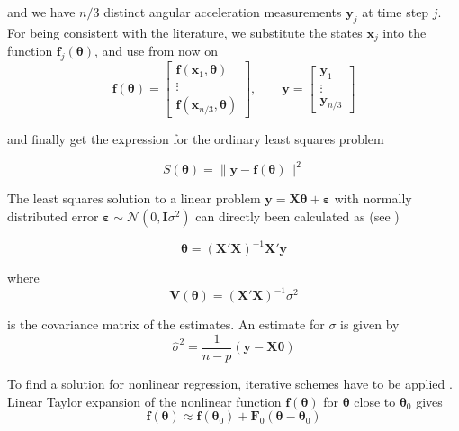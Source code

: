 and we have $n/3$ distinct angular acceleration measurements $\mathbf{y}_j$ at time step $j$.
For being consistent with the literature, we substitute the states $\mathbf{x}_j$ into the function $\mathbf{f}_j(\boldsymbol{\theta})$, and use from now on
\begin{equation}
\mathbf{f}(\boldsymbol{\theta}) = \left[ \begin{array}{c}
\mathbf{f}(\mathbf{x}_1, \boldsymbol{\theta}) \\
\vdots \\
\mathbf{f}(\mathbf{x}_{n/3}, \boldsymbol{\theta})
\end{array} \right]
, \qquad
\mathbf{y} = \left[ \begin{array}{c}
\mathbf{y}_1 \\
\vdots \\
\mathbf{y}_{n/3} 
\end{array} \right]
\end{equation}

and finally get the expression for the ordinary least squares problem

\begin{equation}
S(\boldsymbol{\theta}) = \| \mathbf{y} - \mathbf{f}(\boldsymbol{\theta}) \|^2
\end{equation}

The least squares solution to a linear problem 
$\mathbf{y} = \mathbf{X} \boldsymbol{\theta} + \boldsymbol{\varepsilon}$ 
with normally distributed error 
$\boldsymbol{\varepsilon} \sim \mathcal{N}(0,\mathbf{I} \sigma^2)$ 
can directly been calculated as (see \citep{Draper})

\begin{equation}
\boldsymbol{\theta} = (\mathbf{X}' \mathbf{X})^{-1} \mathbf{X}' \mathbf{y}
\end{equation}

where
\begin{equation}
\mathbf{V} (\boldsymbol{\theta}) = (\mathbf{X}' \mathbf{X})^{-1} {\sigma}^2
\end{equation}

is the covariance matrix of the estimates. An estimate for ${\sigma}$ is given by
\begin{equation}
\hat{\sigma}^2 = \frac{1}{n-p} (\mathbf{y} - \mathbf{X} \boldsymbol{\theta})
\end{equation}

To find a solution for nonlinear regression, iterative schemes have to be applied \citep{Seber}.
Linear Taylor expansion of the nonlinear function
$\mathbf{f}(\boldsymbol{\theta})$ 
for 
$\boldsymbol{\theta}$
close to 
$\boldsymbol{\theta}_0$
gives
\begin{equation}
\mathbf{f}(\boldsymbol{\theta}) \approx
\mathbf{f}(\boldsymbol{\theta}_0) + \mathbf{F}_0(\boldsymbol{\theta} - \boldsymbol{\theta}_0)
\end{equation}


